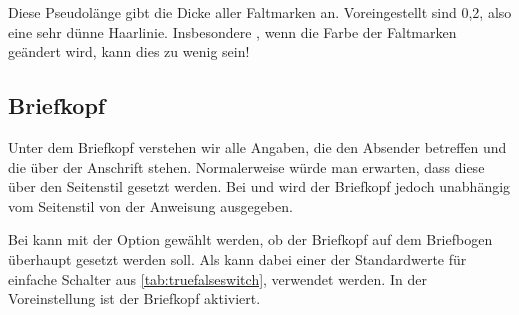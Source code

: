 \begin{Declaration}
\end{Declaration}
Diese Pseudolänge gibt die Dicke aller
Faltmarken an. Voreingestellt sind 0,2, also
eine sehr dünne Haarlinie. Insbesondere , wenn die Farbe der Faltmarken
geändert wird, kann dies zu wenig sein!%
\EndIndexGroup
%
\EndIndexGroup


\subsection{Briefkopf}
\BeginIndexGroup
{}%

Unter dem Briefkopf verstehen wir alle Angaben, die den Absender betreffen und
die über der Anschrift stehen. Normalerweise würde man erwarten, dass diese
über den Seitenstil gesetzt werden. %
\iffalse%
Bei der alten Briefklasse \Class{scrlettr} war dies auch so. %
\fi%
Bei  und  wird der
Briefkopf jedoch unabhängig vom Seitenstil von der Anweisung
 ausgegeben.
\iffalse%
Dabei wird der Briefkopf absolut positioniert, ist also vom Satzspiegel
unabhängig.  Die erste Seite eines Briefes, also die Seite mit dem Briefkopf,
wird tatsächlich mit dem Seitenstil
\DescRef{\LabelBase.pagestyle.empty}\IndexPagestyle{empty} gesetzt.%
\fi

\begin{Declaration}
\end{Declaration}
\iffalse%
Das\ChangedAt{v2.97e}{\Class{scrlttr2}} oberste Element eines Briefbogens ist
normalerweise der Briefkopf. Bei
\else%
Bei
\fi%
\KOMAScript{} kann mit der Option
 gewählt werden, ob der Briefkopf auf dem Briefbogen
überhaupt gesetzt werden soll. Als  kann dabei einer der
Standardwerte für einfache Schalter aus \autoref{tab:truefalseswitch},
 verwendet werden. In der Voreinstellung ist
der Briefkopf aktiviert.%
%
\EndIndexGroup


